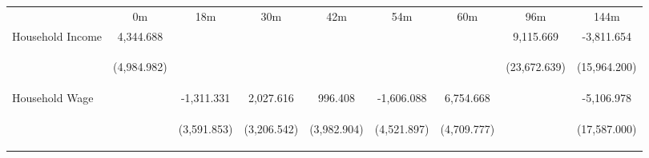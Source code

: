 \begin{tabular}{lcccccccc}
\hline \noalign{\smallskip} & 0m & 18m & 30m & 42m & 54m & 60m & 96m & 144m\\
\noalign{\smallskip}\hline \noalign{\smallskip}Household Income & 4,344.688 &  &  &  &  &  & 9,115.669 & -3,811.654\\
 & \begin{footnotesize}(4,984.982)\end{footnotesize} & \begin{footnotesize}\end{footnotesize} & \begin{footnotesize}\end{footnotesize} & \begin{footnotesize}\end{footnotesize} & \begin{footnotesize}\end{footnotesize} & \begin{footnotesize}\end{footnotesize} & \begin{footnotesize}(23,672.639)\end{footnotesize} & \begin{footnotesize}(15,964.200)\end{footnotesize}\\
\noalign{\smallskip}Household Wage &  & -1,311.331 & 2,027.616 & 996.408 & -1,606.088 & 6,754.668 &  & -5,106.978\\
 & \begin{footnotesize}\end{footnotesize} & \begin{footnotesize}(3,591.853)\end{footnotesize} & \begin{footnotesize}(3,206.542)\end{footnotesize} & \begin{footnotesize}(3,982.904)\end{footnotesize} & \begin{footnotesize}(4,521.897)\end{footnotesize} & \begin{footnotesize}(4,709.777)\end{footnotesize} & \begin{footnotesize}\end{footnotesize} & \begin{footnotesize}(17,587.000)\end{footnotesize}\\

\end{tabular}
